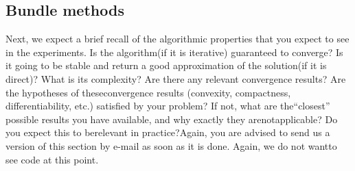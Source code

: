  

\subsection{Bundle methods}


Next, we expect a brief recall of the algorithmic properties that you expect to see in the experiments. Is the algorithm(if it is iterative) guaranteed to converge? Is it going to be stable and return a good approximation of the solution(if it is direct)? What is its complexity? Are there any relevant convergence results? Are the hypotheses of theseconvergence results (convexity, compactness, differentiability, etc.) satisfied by your problem? If not, what are the“closest” possible results you have available, and why exactly they arenotapplicable?  Do you expect this to berelevant in practice?Again, you are advised to send us a version of this section by e-mail as soon as it is done. Again, we do not wantto see code at this point.